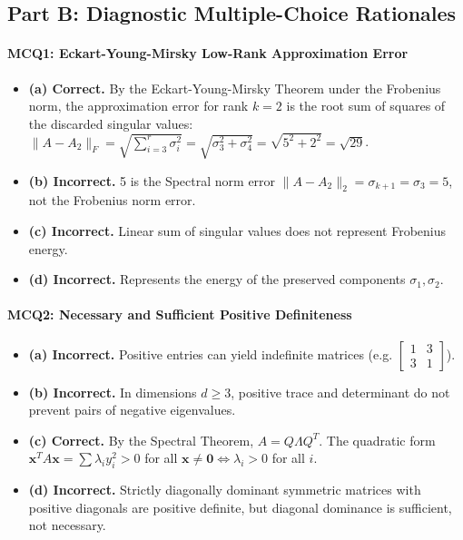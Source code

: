 \subsection*{Part B: Diagnostic Multiple-Choice Rationales}

\paragraph{MCQ1: Eckart-Young-Mirsky Low-Rank Approximation Error}
\begin{itemize}
    \item \textbf{(a) Correct.} By the Eckart-Young-Mirsky Theorem under the Frobenius norm, the approximation error for rank $k = 2$ is the root sum of squares of the discarded singular values: $\|A - A_2\|_F = \sqrt{\sum_{i=3}^r \sigma_i^2} = \sqrt{\sigma_3^2 + \sigma_4^2} = \sqrt{5^2 + 2^2} = \sqrt{29}$.
    \item \textbf{(b) Incorrect.} 5 is the Spectral norm error $\|A - A_2\|_2 = \sigma_{k+1} = \sigma_3 = 5$, not the Frobenius norm error.
    \item \textbf{(c) Incorrect.} Linear sum of singular values does not represent Frobenius energy.
    \item \textbf{(d) Incorrect.} Represents the energy of the preserved components $\sigma_1, \sigma_2$.
\end{itemize}

\paragraph{MCQ2: Necessary and Sufficient Positive Definiteness}
\begin{itemize}
    \item \textbf{(a) Incorrect.} Positive entries can yield indefinite matrices (e.g. $\begin{bmatrix} 1 & 3 \\ 3 & 1 \end{bmatrix}$).
    \item \textbf{(b) Incorrect.} In dimensions $d \ge 3$, positive trace and determinant do not prevent pairs of negative eigenvalues.
    \item \textbf{(c) Correct.} By the Spectral Theorem, $A = Q \Lambda Q^T$. The quadratic form $\mathbf{x}^T A \mathbf{x} = \sum \lambda_i y_i^2 > 0$ for all $\mathbf{x} \ne \mathbf{0} \iff \lambda_i > 0$ for all $i$.
    \item \textbf{(d) Incorrect.} Strictly diagonally dominant symmetric matrices with positive diagonals are positive definite, but diagonal dominance is sufficient, not necessary.
\end{itemize}

